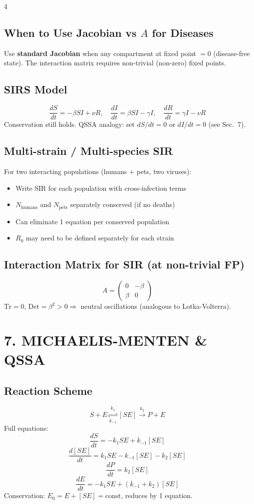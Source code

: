 \documentclass[8pt,landscape]{article}
\begin{document}
\begin{multicols}{4}
\subsection{When to Use Jacobian vs $A$ for Diseases}
Use \textbf{standard Jacobian} when any compartment at fixed point $= 0$ (disease-free state). The interaction matrix requires non-trivial (non-zero) fixed points.

\subsection{SIRS Model}
\[
\frac{dS}{dt} = -\beta SI + \nu R, \quad \frac{dI}{dt} = \beta SI - \gamma I, \quad \frac{dR}{dt} = \gamma I - \nu R
\]
Conservation still holds. QSSA analogy: set $dS/dt = 0$ or $dI/dt = 0$ (see Sec.~7).

\subsection{Multi-strain / Multi-species SIR}
For two interacting populations (humans + pets, two viruses):
\begin{itemize}
  \item Write SIR for each population with cross-infection terms
  \item $N_{\text{humans}}$ and $N_{\text{pets}}$ separately conserved (if no deaths)
  \item Can eliminate 1 equation per conserved population
  \item $R_0$ may need to be defined separately for each strain
\end{itemize}

\subsection{Interaction Matrix for SIR (at non-trivial FP)}
\[
A = \begin{pmatrix} 0 & -\beta \\ \beta & 0 \end{pmatrix}
\]
$\text{Tr} = 0$, $\text{Det} = \beta^2 > 0 \Rightarrow$ neutral oscillations (analogous to Lotka-Volterra).

\section{7. MICHAELIS-MENTEN \& QSSA}

\subsection{Reaction Scheme}
\[
S + E \underset{k_{-1}}{\overset{k_1}{\rightleftharpoons}} [SE] \overset{k_2}{\longrightarrow} P + E
\]
Full equations:
\[
\frac{dS}{dt} = -k_1 SE + k_{-1}[SE]
\]
\[
\frac{d[SE]}{dt} = k_1 SE - k_{-1}[SE] - k_2[SE]
\]
\[
\frac{dP}{dt} = k_2[SE]
\]
\[
\frac{dE}{dt} = -k_1 SE + (k_{-1}+k_2)[SE]
\]
Conservation: $E_0 = E + [SE] = \text{const}$, reduces by 1 equation.


\end{multicols}
\end{document}
